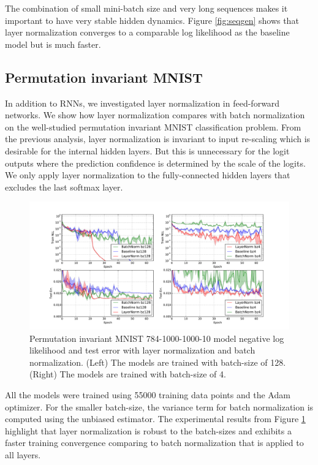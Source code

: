 \documentclass{article}
\begin{document}
The combination of small mini-batch size and very long sequences makes it important to have very stable hidden dynamics. Figure \ref{fig:seqgen} shows that layer normalization converges to a comparable log likelihood as the baseline model but is much faster.

\subsection{Permutation invariant MNIST}

In addition to RNNs, we investigated layer normalization in feed-forward networks. We show how layer normalization compares with batch normalization on the well-studied permutation invariant MNIST classification problem. From the previous analysis, layer normalization is invariant to input re-scaling which is desirable for the internal hidden layers. But this is unnecessary for the logit outputs where the prediction confidence is determined by the scale of the logits. We only apply layer normalization to the fully-connected hidden layers that excludes the last softmax layer.  

\begin{figure}
  \vspace{-0.6in}
  \centering
\includegraphics[width=0.9\columnwidth]{figures/mnist_ln2.pdf}  
\caption{Permutation invariant MNIST 784-1000-1000-10 model negative log likelihood and test error with layer normalization and batch normalization. (Left) The models are trained with batch-size of 128. (Right) The models are trained with batch-size of 4. 
\vspace{-0.15in}
}
\label{fig:mnist}
\vspace{-0.05in}
\end{figure}

All the models were trained using 55000 training data points and the Adam \citep{adam} optimizer. For the smaller batch-size, the variance term for batch normalization is computed using the unbiased estimator.
The experimental results from Figure \ref{fig:mnist} highlight that layer normalization is robust to the batch-sizes and exhibits a faster training convergence comparing to batch normalization that is applied to all layers.
\end{document}
